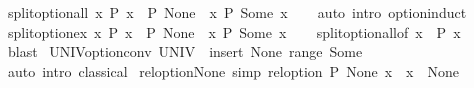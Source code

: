 \begin{isabellebody}
%
\isadelimproof
\isanewline
%
\endisadelimproof
\isanewline
{}\isamarkupfalse%
\ split{\isacharunderscore}{\kern0pt}option{\isacharunderscore}{\kern0pt}all{\isacharcolon}{\kern0pt}\ {\isachardoublequoteopen}{\isacharparenleft}{\kern0pt}{\isasymforall}x{\isachardot}{\kern0pt}\ P\ x{\isacharparenright}{\kern0pt}\ {\isasymlongleftrightarrow}\ P\ None\ {\isasymand}\ {\isacharparenleft}{\kern0pt}{\isasymforall}x{\isachardot}{\kern0pt}\ P\ {\isacharparenleft}{\kern0pt}Some\ x{\isacharparenright}{\kern0pt}{\isacharparenright}{\kern0pt}{\isachardoublequoteclose}\isanewline
%
\isadelimproof
\ \ %
\endisadelimproof
%
\isatagproof
{}\isamarkupfalse%
\ {\isacharparenleft}{\kern0pt}auto\ intro{\isacharcolon}{\kern0pt}\ option{\isachardot}{\kern0pt}induct{\isacharparenright}{\kern0pt}%
\endisatagproof
{\isafoldproof}%
%
\isadelimproof
\isanewline
%
\endisadelimproof
\isanewline
{}\isamarkupfalse%
\ split{\isacharunderscore}{\kern0pt}option{\isacharunderscore}{\kern0pt}ex{\isacharcolon}{\kern0pt}\ {\isachardoublequoteopen}{\isacharparenleft}{\kern0pt}{\isasymexists}x{\isachardot}{\kern0pt}\ P\ x{\isacharparenright}{\kern0pt}\ {\isasymlongleftrightarrow}\ P\ None\ {\isasymor}\ {\isacharparenleft}{\kern0pt}{\isasymexists}x{\isachardot}{\kern0pt}\ P\ {\isacharparenleft}{\kern0pt}Some\ x{\isacharparenright}{\kern0pt}{\isacharparenright}{\kern0pt}{\isachardoublequoteclose}\isanewline
%
\isadelimproof
\ \ %
\endisadelimproof
%
\isatagproof
{}\isamarkupfalse%
\ split{\isacharunderscore}{\kern0pt}option{\isacharunderscore}{\kern0pt}all{\isacharbrackleft}{\kern0pt}of\ {\isachardoublequoteopen}{\isasymlambda}x{\isachardot}{\kern0pt}\ {\isasymnot}\ P\ x{\isachardoublequoteclose}{\isacharbrackright}{\kern0pt}\ \isamarkupfalse%
\ blast%
\endisatagproof
{\isafoldproof}%
%
\isadelimproof
\isanewline
%
\endisadelimproof
\isanewline
{}\isamarkupfalse%
\ UNIV{\isacharunderscore}{\kern0pt}option{\isacharunderscore}{\kern0pt}conv{\isacharcolon}{\kern0pt}\ {\isachardoublequoteopen}UNIV\ {\isacharequal}{\kern0pt}\ insert\ None\ {\isacharparenleft}{\kern0pt}range\ Some{\isacharparenright}{\kern0pt}{\isachardoublequoteclose}\isanewline
%
\isadelimproof
\ \ %
\endisadelimproof
%
\isatagproof
{}\isamarkupfalse%
\ {\isacharparenleft}{\kern0pt}auto\ intro{\isacharcolon}{\kern0pt}\ classical{\isacharparenright}{\kern0pt}%
\endisatagproof
{\isafoldproof}%
%
\isadelimproof
\isanewline
%
\endisadelimproof
\isanewline
{}\isamarkupfalse%
\ rel{\isacharunderscore}{\kern0pt}option{\isacharunderscore}{\kern0pt}None{}\ {\isacharbrackleft}{\kern0pt}simp{\isacharbrackright}{\kern0pt}{\isacharcolon}{\kern0pt}\ {\isachardoublequoteopen}rel{\isacharunderscore}{\kern0pt}option\ P\ None\ x\ {\isasymlongleftrightarrow}\ x\ {\isacharequal}{\kern0pt}\ None{\isachardoublequoteclose}\isanewline

\end{isabellebody}
